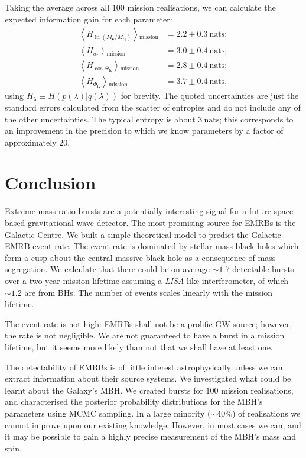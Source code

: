 \documentclass[useAMS,usedcolumn,usegraphicx,usenatbib]{mn2e}
\newcommand{\units}[1]{\ensuremath{~\mathrm{#1}}}
\newcommand{\sub}[1]{\ensuremath{_\mathrm{#1}}}
\begin{document}
Taking the average across all $100$ mission realisations, we can calculate the expected information gain for each parameter:
\begin{equation}
\begin{split}
\left\langle H_{\ln(M_\bullet/M_\odot)}\right\rangle\sub{mission} & = 2.2 \pm 0.3 \units{nats}; \\
\left\langle H_{a_\ast}\right\rangle\sub{mission} & = 3.0 \pm 0.4 \units{nats}; \\
\left\langle H_{\cos\Theta\sub{K}}\right\rangle\sub{mission} & = 2.8 \pm 0.4 \units{nats}; \\
\left\langle H_{\Phi\sub{K}}\right\rangle\sub{mission} & = 3.7 \pm 0.4 \units{nats},
\end{split}
\end{equation}
using $H_\lambda \equiv H(p(\lambda)|q(\lambda))$ for brevity. The quoted uncertainties are just the standard errors calculated from the scatter of entropies and do not include any of the other uncertainties. The typical entropy is about $3 \units{nats}$; this corresponds to an improvement in the precision to which we know parameters by a factor of approximately $20$.

\section{Conclusion}\label{sec:Gal-End}

Extreme-mass-ratio bursts are a potentially interesting signal for a future space-based gravitational wave detector. The most promising source for EMRBs is the Galactic Centre. We built a simple theoretical model to predict the Galactic EMRB event rate. The event rate is dominated by stellar mass black holes which form a cusp about the central massive black hole as a consequence of mass segregation. We calculate that there could be on average $\sim1.7$ detectable bursts over a two-year mission lifetime assuming a \textit{LISA}-like interferometer, of which $\sim1.2$ are from BHs. The number of events scales linearly with the mission lifetime.

The event rate is not high: EMRBs shall not be a prolific GW source; however, the rate is not negligible. We are not guaranteed to have a burst in a mission lifetime, but it seems more likely than not that we shall have at least one.

The detectability of EMRBs is of little interest astrophysically unless we can extract information about their source systems. We investigated what could be learnt about the Galaxy's MBH. We created bursts for $100$ mission realisations, and characterised the posterior probability distributions for the MBH's parameters using MCMC sampling. In a large minority ($\sim40\%$) of realisations we cannot improve upon our existing knowledge. However, in most cases we can, and it may be possible to gain a highly precise measurement of the MBH's mass and spin.
\end{document}
